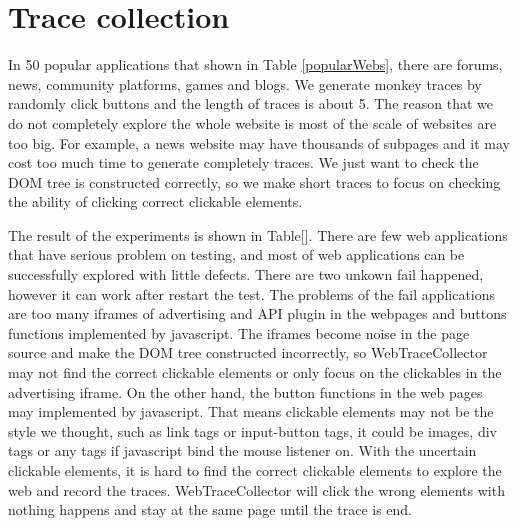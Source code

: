 \section{Trace collection}

In 50 popular applications\cite{popularWebs} that shown in Table \ref{popularWebs},
there are forums, news, community platforms, games and blogs.
We generate monkey traces by randomly click buttons and the length of traces is about 5.
The reason that we do not completely explore the whole website is most of the scale of websites are too big.
For example, a news website may have thousands of subpages and it may cost too much time to generate completely traces.
We just want to check the DOM tree is constructed correctly, 
so we make short traces to focus on checking the ability of clicking correct clickable elements.

The result of the experiments is shown in Table[].
There are few web applications that have serious problem on testing,
and most of web applications can be successfully explored with little defects.
There are two unkown fail happened, however it can work after restart the test.
The problems of the fail applications are 
too many iframes of advertising and API plugin in the webpages and buttons functions implemented by javascript.
The iframes become noise in the page source and make the DOM tree constructed incorrectly,
so WebTraceCollector may not find the correct clickable elements or only focus on the clickables in the advertising iframe.
On the other hand, the button functions in the web pages may implemented by javascript.
That means clickable elements may not be the style we thought, such as link tags or input-button tags,
it could be images, div tags or any tags if javascript bind the mouse listener on.
With the uncertain clickable elements, it is hard to find the correct clickable elements to explore the web and record the traces.
WebTraceCollector will click the wrong elements with nothing happens and stay at the same page until the trace is end.

